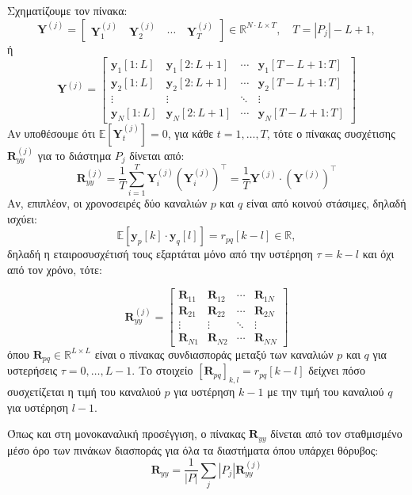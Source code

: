 \documentclass[12pt]{article} %
\begin{document}
Σχηματίζουμε τον πίνακα:
\[
\mathbf{Y}^{(j)} = 
\begin{bmatrix}
\mathbf{Y}_1^{(j)} \quad \mathbf{Y}_2^{(j)} \quad \cdots \quad \mathbf{Y}_T^{(j)}
\end{bmatrix}
\in \mathbb{R}^{N \cdot L \times T}, \quad T = |P_j| - L + 1,
\]
ή
\[
\mathbf{Y}^{(j)} = 
\begin{bmatrix}
    \mathbf{y}_1[1:L] & \mathbf{y}_1[2:L+1] & \cdots & \mathbf{y}_1[T-L+1:T] \\
    \mathbf{y}_2[1:L] & \mathbf{y}_2[2:L+1] & \cdots & \mathbf{y}_2[T-L+1:T] \\
    \vdots & \vdots & \ddots & \vdots \\
    \mathbf{y}_N[1:L] & \mathbf{y}_N[2:L+1] & \cdots & \mathbf{y}_N[T-L+1:T]
\end{bmatrix}
\]
Αν υποθέσουμε ότι $\mathbb{E}[\mathbf{Y}_t^{(j)}] = 0$, για κάθε $t = 1, \ldots, T$,  
τότε ο πίνακας συσχέτισης $\mathbf{R}_{yy}^{(j)}$ για το διάστημα $P_j$ δίνεται από:
\[
\mathbf{R}_{yy}^{(j)} = 
\frac{1}{T} \sum_{i=1}^T \mathbf{Y}_i^{(j)} \left(\mathbf{Y}_i^{(j)}\right)^{\top} = 
\frac{1}{T} \mathbf{Y}^{(j)} \cdot \left(\mathbf{Y}^{(j)}\right)^{\top}
\]
Αν, επιπλέον, οι χρονοσειρές δύο καναλιών $p$ και $q$ είναι από κοινού στάσιμες,  
δηλαδή ισχύει:
\[
\mathbb{E}[\mathbf{y}_p[k] \cdot \mathbf{y}_q[l]] = r_{pq}[k - l] \in \mathbb{R},
\]
δηλαδή η εταιροσυσχέτισή τους εξαρτάται μόνο από την υστέρηση $\tau = k - l$ και όχι από τον χρόνο, τότε:

\[
\mathbf{R}_{yy}^{(j)} =
\begin{bmatrix}
    \mathbf{R}_{11} & \mathbf{R}_{12} & \cdots & \mathbf{R}_{1N} \\
    \mathbf{R}_{21} & \mathbf{R}_{22} & \cdots & \mathbf{R}_{2N} \\
    \vdots & \vdots & \ddots & \vdots \\
    \mathbf{R}_{N1} & \mathbf{R}_{N2} & \cdots & \mathbf{R}_{NN}
\end{bmatrix}
\]
όπου $\mathbf{R}_{pq} \in \mathbb{R}^{L \times L}$ είναι ο πίνακας συνδιασποράς μεταξύ των καναλιών $p$ και 
$q$ για υστερήσεις $\tau = 0, \ldots, L - 1$. Το στοιχείο $[\mathbf{R}_{pq}]_{k, l} = r_{pq}[k - l]$ δείχνει
πόσο συσχετίζεται η τιμή του καναλιού $p$ για υστέρηση $k - 1$ με την τιμή του καναλιού $q$ για υστέρηση 
$l - 1$.

Όπως και στη μονοκαναλική προσέγγιση, ο πίνακας $\mathbf{R}_{yy}$ δίνεται από τον σταθμισμένο μέσο όρο  
των πινάκων διασποράς για όλα τα διαστήματα όπου υπάρχει θόρυβος:
\[
\mathbf{R}_{yy} = \frac{1}{|P|} \sum_j |P_j| \mathbf{R}_{yy}^{(j)}
\]
\end{document}
